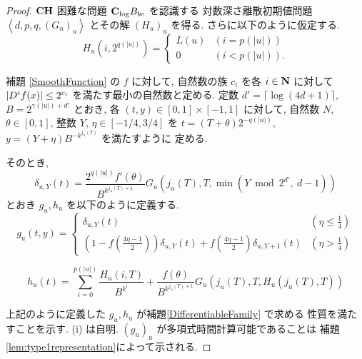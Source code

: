  \begin{proof}
  $\mathbf{CH}$ 困難な問題 $\mathbf{C}_{\log} B_{be}$ を認識する
  対数深さ離散初期値問題 $\left< d, p, q,(G_u)_u \right>$
  とその解 $(H_u)_u$ を得る. さらに以下のように仮定する.
  \begin{equation}
   H_u(i, 2^{q(|u|)}) = \begin{cases}
			L(u) & (i=p(|u|)) \\
			0 & (i<p(|u|)).
			\end{cases}
  \end{equation}

  補題 \ref{SmoothFunction} の $f$ に対して, 
  自然数の族 $c_i$ を各 $i \in \mathbf N$ に対して 
  $|D^i f(x)| \le 2^{c_i}$ を満たす最小の自然数と定める.
 定数 $d' = \lceil \log (4d + 1) \rceil$, 
 $B = 2^{\gamma(|u|) + d'}$ とおき, 
 各 $(t, y) \in [0,1] \times [-1, 1]$ に対して,
 自然数 $N$, $\theta \in [0,1]$, 整数 $Y$, $\eta \in [-1/4, 3/4]$ を
 $t = (T + \theta)2^{-q(|u|)}$, $y = (Y + \eta)B^{-k^{j_u(T)}}$ を満たすように
 定める.
 
 そのとき,
 \begin{equation}
  \delta_{u, Y} (t) = \frac{2^{q(|u|)} f'(\theta)}{B^{k^{j_u(T)+1}}} 
   G_u\left( j_u(T), T, \min \left(Y \bmod 2^{d'}\!\!\!,\ d-1 \right) \right)
 \end{equation}
 とおき $g_u, h_u$ を以下のように定義する.
 \begin{equation}
  g_u(t,y) 
  = \begin{cases}
     \delta_{u, Y}(t)
     & (\eta \le \frac 1 4)
     \\
     ( 1-f ( \frac{4\eta-1}{2})) \delta_{u, Y}(t) 
     + f ( \frac{4\eta-1}{2}) \delta_{u,Y+1}(t)
     & (\eta > \frac 1 4)
    \end{cases}
 \end{equation}

 \begin{equation} 
  h_u(t) = \sum^{p(|u|)}_{i=0} \frac{H_u(i, T)}{B^{k^i}}  
  + \frac{f(\theta)}{B^{k^{j_u(T)+1}}} G_u(j_u(T), T, H_u(j_u(T), T)) 
  \label{eq:hu}
 \end{equation}

 上記のように定義した $g_u, h_u$ が補題\ref{DifferentiableFamily} で求める
 性質を満たすことを示す. (i) は自明. 
 $(g_u)_u$ が多項式時間計算可能であることは
  補題 \ref{lem:type1representation}によって示される.


\end{proof}

